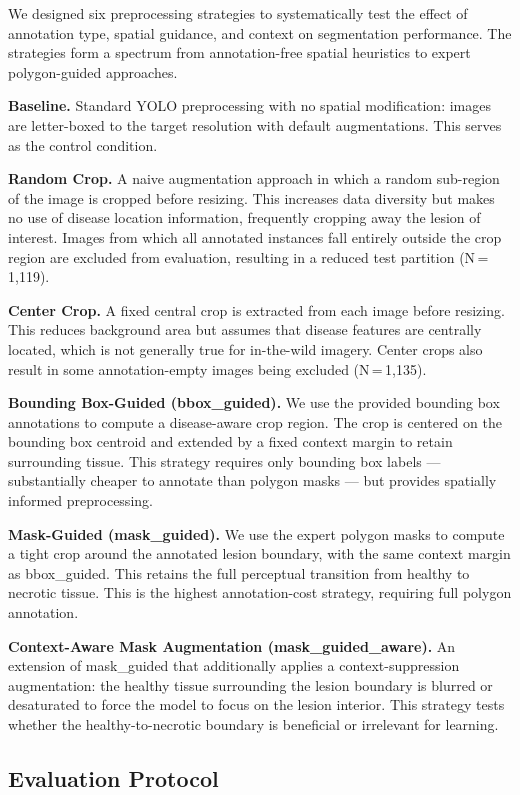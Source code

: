 \documentclass[preprint,12pt]{elsarticle}
\begin{document}
We designed six preprocessing strategies to systematically test the effect of annotation type, spatial guidance, and context on segmentation performance. The strategies form a spectrum from annotation-free spatial heuristics to expert polygon-guided approaches.

\textbf{Baseline.} Standard YOLO preprocessing with no spatial modification: images are letter-boxed to the target resolution with default augmentations. This serves as the control condition.

\textbf{Random Crop.} A naive augmentation approach in which a random sub-region of the image is cropped before resizing. This increases data diversity but makes no use of disease location information, frequently cropping away the lesion of interest. Images from which all annotated instances fall entirely outside the crop region are excluded from evaluation, resulting in a reduced test partition (N\,=\,1,119).

\textbf{Center Crop.} A fixed central crop is extracted from each image before resizing. This reduces background area but assumes that disease features are centrally located, which is not generally true for in-the-wild imagery. Center crops also result in some annotation-empty images being excluded (N\,=\,1,135).

\textbf{Bounding Box-Guided (bbox\_guided).} We use the provided bounding box annotations to compute a disease-aware crop region. The crop is centered on the bounding box centroid and extended by a fixed context margin to retain surrounding tissue. This strategy requires only bounding box labels --- substantially cheaper to annotate than polygon masks --- but provides spatially informed preprocessing.

\textbf{Mask-Guided (mask\_guided).} We use the expert polygon masks to compute a tight crop around the annotated lesion boundary, with the same context margin as bbox\_guided. This retains the full perceptual transition from healthy to necrotic tissue. This is the highest annotation-cost strategy, requiring full polygon annotation.

\textbf{Context-Aware Mask Augmentation (mask\_guided\_aware).} An extension of mask\_guided that additionally applies a context-suppression augmentation: the healthy tissue surrounding the lesion boundary is blurred or desaturated to force the model to focus on the lesion interior. This strategy tests whether the healthy-to-necrotic boundary is beneficial or irrelevant for learning.

\subsection{Evaluation Protocol}
\end{document}
